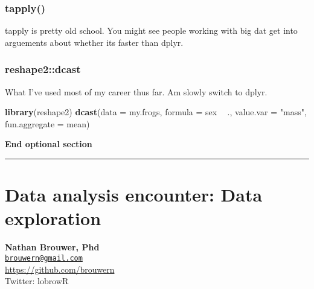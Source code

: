 \documentclass[]{book}
\newenvironment{Shaded}{\begin{snugshade}}{\end{snugshade}}
\newcommand{\KeywordTok}[1]{\textcolor[rgb]{0.13,0.29,0.53}{\textbf{#1}}}
\newcommand{\DataTypeTok}[1]{\textcolor[rgb]{0.13,0.29,0.53}{#1}}
\newcommand{\StringTok}[1]{\textcolor[rgb]{0.31,0.60,0.02}{#1}}
\newcommand{\OperatorTok}[1]{\textcolor[rgb]{0.81,0.36,0.00}{\textbf{#1}}}
\newcommand{\NormalTok}[1]{#1}
\theoremstyle{definition}
\theoremstyle{definition}
\theoremstyle{definition}
\theoremstyle{remark}
\begin{document}
\subsection{tapply()}\label{tapply}

tapply is pretty old school. You might see people working with big dat
get into arguements about whether its faster than dplyr.

\begin{Shaded}
\end{Shaded}

\subsection{reshape2::dcast}\label{reshape2dcast}

What I've used most of my career thus far. Am slowly switch to dplyr.

\begin{Shaded}
\begin{Highlighting}[]
\KeywordTok{library}\NormalTok{(reshape2)}
\KeywordTok{dcast}\NormalTok{(}\DataTypeTok{data =}\NormalTok{ my.frogs,}
      \DataTypeTok{formula =}\NormalTok{ sex }\OperatorTok{~}\StringTok{ }\NormalTok{.,}
      \DataTypeTok{value.var =} \StringTok{"mass"}\NormalTok{,}
      \DataTypeTok{fun.aggregate  =}\NormalTok{ mean)}
\end{Highlighting}
\end{Shaded}

\textbf{End optional section}

\begin{center}\rule{0.5\linewidth}{\linethickness}\end{center}

\chapter{Data analysis encounter: Data
exploration}\label{data-analysis-encounter-data-exploration}

\textbf{Nathan Brouwer, Phd}\\
\href{mailto:brouwern@gmail.com}{\nolinkurl{brouwern@gmail.com}}\\
\url{https://github.com/brouwern}\\
Twitter: lobrowR
\end{document}
